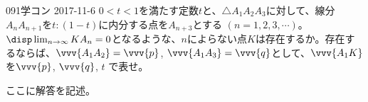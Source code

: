 \begin{prob}{091}{}{学コン 2017-11-6}
 $0<t<1$を満たす定数$t$と、$\triangle{A_1A_2A_3}$に対して、線分$A_nA_{n+1}$を$t:(1-t)$に内分する点を$A_{n+3}$とする $(n=1, 2, 3, \cdots)$。$\disp \lim_{n\to\infty}KA_n=0$となるような、$n$によらない点$K$は存在するか。存在するならば、$\vvv{A_1A_2}=\vvv{p}$, $\vvv{A_1A_3}=\vvv{q}$として、$\vvv{A_1K}$を$\vvv{p}$, $\vvv{q}$, $t$ で表せ。
\end{prob}
ここに解答を記述。